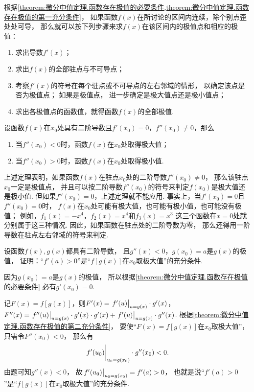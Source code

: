 根据\cref{theorem:微分中值定理.函数存在极值的必要条件,theorem:微分中值定理.函数存在极值的第一充分条件}，
如果函数\(f(x)\)在所讨论的区间内连续，除个别点歪处处可导，
那么就可以按下列步骤来求\(f(x)\)在该区间内的极值点和相应的极值：
\begin{enumerate}
	\item 求出导数\(f'(x)\)；
	\item 求出\(f(x)\)的全部驻点与不可导点；
	\item 考察\(f'(x)\)的符号在每个驻点或不可导点的左右邻域的情形，
	以确定该点是否为极值点；
	如果是极值点，
	进一步确定是极大值点还是极小值点；
	\item 求出各极值点的函数值，就得函数\(f(x)\)的全部极值.
\end{enumerate}

\begin{theorem}[函数存在极值的第二充分条件]\label{theorem:微分中值定理.函数存在极值的第二充分条件}
设函数\(f(x)\)在\(x_0\)处具有二阶导数且\(f'(x_0)=0\)，\(f''(x_0)\neq 0\)，那么
\begin{enumerate}
	\item 当\(f''(x_0)<0\)时，函数\(f(x)\)在\(x_0\)处取得极大值；
	\item 当\(f''(x_0)>0\)时，函数\(f(x)\)在\(x_0\)处取得极小值.
\end{enumerate}
\end{theorem}
上述定理表明，如果函数\(f(x)\)在驻点\(x_0\)处的二阶导数\(f''(x_0)\neq0\)，
那么该驻点\(x_0\)一定是极值点，
并且可以按二阶导数\(f''(x_0)\)的符号来判定\(f(x_0)\)是极大值还是极小值.
但如果\(f''(x_0)=0\)，上述定理就不能应用.
事实上，当\(f'(x_0)=0\)且\(f''(x_0)=0\)时，
\(f(x)\)在\(x_0\)处可能有极大值，也可能有极小值，也可能没有极值；
例如，\(f_1(x) = -x^4\)，\(f_2(x) = x^4\)和\(f_3(x) = x^3\)
这三个函数在\(x=0\)处就分别属于这三种情况.
因此，如果函数在驻点处的二阶导数为零，
那么还得用一阶导数在驻点左右邻域的符号来判定.

\begin{example}
设函数\(f(x),g(x)\)都具有二阶导数，
且\(g''(x)<0\)，\(g(x_0)=a\)是\(g(x)\)的极值，
证明：“\(f'(a)>0\)”是“\(f[g(x)]\)在\(x_0\)取极大值”的充分条件.
\begin{solution}
因为\(g(x_0)=a\)是\(g(x)\)的极值，
所以根据\cref{theorem:微分中值定理.函数存在极值的必要条件}
必有\(g'(x_0)=0\).

记\(F(x) = f[g(x)]\)，则\(F'(x) = \eval{f'(u)}_{u=g(x)} \cdot g'(x)\)，
\(F''(x) = \eval{f''(u)}_{u=g(x)} \cdot g'(x) \cdot g'(x)
+ \eval{f'(u)}_{u=g(x)} \cdot g''(x)\).
根据\cref{theorem:微分中值定理.函数存在极值的第二充分条件}，
要使“\(F(x)=f[g(x)]\)在\(x_0\)取极大值”，只需令\(F''(x_0) < 0\)，
那么有\[
	\eval{f'(u_0)}_{u_0=g(x_0)} \cdot g''(x_0) < 0.
\]
由题可知\(g''(x)<0\)，
故\(\eval{f'(u_0)}_{u_0=g(x_0)} = f'(a) > 0\)，
也就是说“\(f'(a)>0\)”是“\(f[g(x)]\)在\(x_0\)取极大值”的充分条件.
\end{solution}
\end{example}


